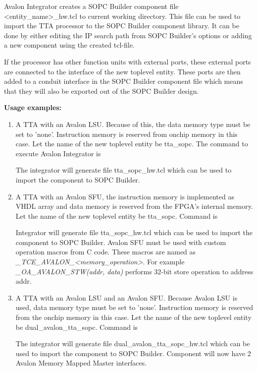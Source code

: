\documentclass[a4paper,twoside]{tceusermanual}
\begin{document}
Avalon Integrator creates a SOPC Builder component file <entity\_name>\_hw.tcl
to current working directory. This file can be used to import the TTA processor
to the SOPC Builder component library. It can be done by either editing 
the IP search path from SOPC Builder's options or adding a new component using 
the created tcl-file.

If the processor has other function units with external ports, these external
ports are connected to the interface of the new toplevel entity. These
ports are then added to a conduit interface in the SOPC Builder component
file which means that they will also be exported out of the SOPC Builder
design.

\textbf{Usage examples:}

\begin{enumerate}
 \item A TTA with an Avalon LSU. Because of this, the data memory type
must be set to 'none'. Instruction memory is reserved from onchip memory in this
case. Let the name of the new toplevel entity be tta\_sopc.
The command to execute Avalon Integrator is


The integrator will generate file tta\_sopc\_hw.tcl which can be used to import the
component to SOPC Builder.

\item A TTA with an Avalon SFU, the instruction memory is implemented
as VHDL array and data memory is reserved from the FPGA's internal memory. Let the
name of the new toplevel entity be tta\_sopc. Command is


Integrator will generate file tta\_sopc\_hw.tcl which can be used to import the
component to SOPC Builder. Avalon SFU must be used with custom operation macros
from C code. These macros are named as \textit{\_TCE\_AVALON\_<memory\_operation>}.
For example \textit{\_OA\_AVALON\_STW(addr, data)} performs 32-bit store operation
to address addr.

\item A TTA with an Avalon LSU and an Avalon SFU. Because Avalon LSU is
used, data memory type must be set to 'none'. Instruction memory is reserved
from the onchip memory in this case. Let the name of the new toplevel entity be
dual\_avalon\_tta\_sopc. Command is


The integrator will generate file dual\_avalon\_tta\_sopc\_hw.tcl which can be
used to import the component to SOPC Builder. Component will now have 2 Avalon
Memory Mapped Master interfaces.

\end{enumerate}
\end{document}
